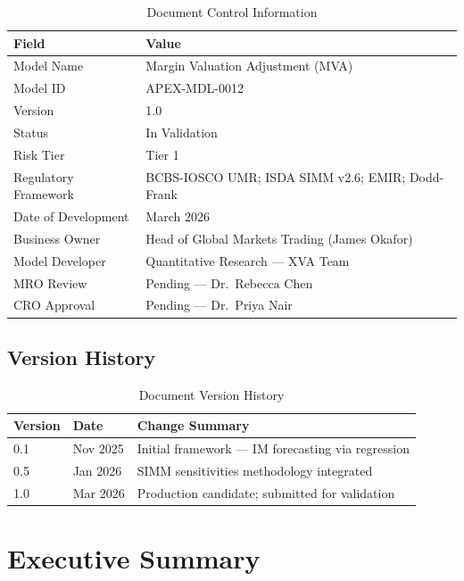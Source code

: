 \documentclass[11pt,a4paper]{article}
\begin{document}
\begin{table}[h!]
\centering
\caption{Document Control Information}
\begin{tabular}{@{}ll@{}}
\toprule
\textbf{Field} & \textbf{Value} \\
\midrule
Model Name            & Margin Valuation Adjustment (MVA) \\
Model ID              & APEX-MDL-0012 \\
Version               & 1.0 \\
Status                & In Validation \\
Risk Tier             & Tier 1 \\
Regulatory Framework  & BCBS-IOSCO UMR; ISDA SIMM v2.6; EMIR; Dodd-Frank \\
Date of Development   & March 2026 \\
Business Owner        & Head of Global Markets Trading (James Okafor) \\
Model Developer       & Quantitative Research --- XVA Team \\
MRO Review            & Pending --- Dr.\ Rebecca Chen \\
CRO Approval          & Pending --- Dr.\ Priya Nair \\
\bottomrule
\end{tabular}
\end{table}

\subsection{Version History}

\begin{table}[h!]
\centering
\caption{Document Version History}
\begin{tabular}{@{}lll@{}}
\toprule
\textbf{Version} & \textbf{Date} & \textbf{Change Summary} \\
\midrule
0.1 & Nov 2025 & Initial framework --- IM forecasting via regression \\
0.5 & Jan 2026 & SIMM sensitivities methodology integrated \\
1.0 & Mar 2026 & Production candidate; submitted for validation \\
\bottomrule
\end{tabular}
\end{table}

\section{Executive Summary}
\end{document}
